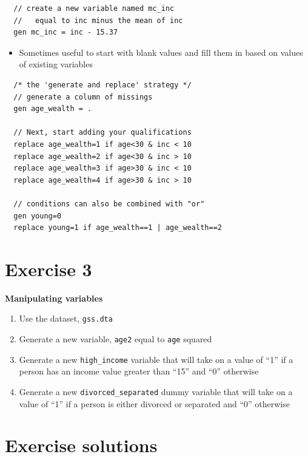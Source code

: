 \documentclass[]{book}
\providecommand{\tightlist}{%
  \setlength{\itemsep}{0pt}\setlength{\parskip}{0pt}}
\begin{document}
\begin{verbatim}
  // create a new variable named mc_inc
  //   equal to inc minus the mean of inc
  gen mc_inc = inc - 15.37  
\end{verbatim}

\begin{itemize}
\tightlist
\item
  Sometimes useful to start with blank values and fill them in based on
  values of existing variables
\end{itemize}

\begin{verbatim}
  /* the 'generate and replace' strategy */ 
  // generate a column of missings
  gen age_wealth = .

  // Next, start adding your qualifications
  replace age_wealth=1 if age<30 & inc < 10
  replace age_wealth=2 if age<30 & inc > 10
  replace age_wealth=3 if age>30 & inc < 10
  replace age_wealth=4 if age>30 & inc > 10

  // conditions can also be combined with "or"
  gen young=0
  replace young=1 if age_wealth==1 | age_wealth==2
\end{verbatim}

\section{Exercise 3}\label{exercise-3-4}

\textbf{Manipulating variables}

\begin{enumerate}
\def\labelenumi{\arabic{enumi}.}
\tightlist
\item
  Use the dataset, \texttt{gss.dta}
\item
  Generate a new variable, \texttt{age2} equal to \texttt{age} squared
\item
  Generate a new \texttt{high\_income} variable that will take on a
  value of ``1'' if a person has an income value greater than ``15'' and
  ``0'' otherwise
\item
  Generate a new \texttt{divorced\_separated} dummy variable that will
  take on a value of ``1'' if a person is either divorced or separated
  and ``0'' otherwise
\end{enumerate}

\section{Exercise solutions}\label{exercise-solutions-4}
\end{document}
